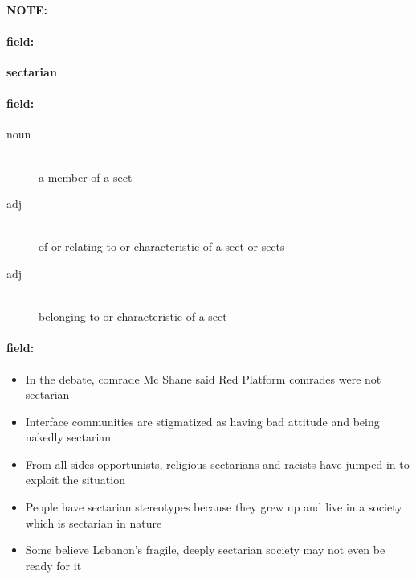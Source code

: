 \documentclass[12pt]{article}
\newenvironment{note}{\paragraph{NOTE:}}{}
\newenvironment{field}{\paragraph{field:}}{}
\begin{document}
\begin{note}
\begin{field}
\textbf{\large sectarian}
\end{field}


\begin{field}
\begin{description}
\item[noun] \hfill \\ 
a member of a sect

\item[adj] \hfill \\ 
of or relating to or characteristic of a sect or sects

\item[adj] \hfill \\ 
belonging to or characteristic of a sect

\end{description}
\end{field}

\begin{field}
\begin{itemize}
\item In the debate, comrade Mc Shane said Red Platform comrades were not sectarian
\item Interface communities are stigmatized as having bad attitude and being nakedly sectarian
\item From all sides opportunists, religious sectarians and racists have jumped in to exploit the situation
\item People have sectarian stereotypes because they grew up and live in a society which is sectarian in nature
\item Some believe Lebanon's fragile, deeply sectarian society may not even be ready for it
\end{itemize}
\end{field}
\end{note}
\end{document}
